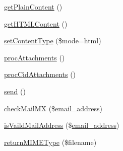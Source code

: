 \begin{DoxyCompactItemize}
\item 
\hyperlink{classMail_ac1a5a2b325a14e6331f13d2b2b18d9f8}{get\+Plain\+Content} ()
\item 
\hyperlink{classMail_a74db66148c78f2e732a3f2797b108eae}{get\+H\+T\+M\+L\+Content} ()
\item 
\hyperlink{classMail_a326329d653ba8e831c724471189e41e3}{set\+Content\+Type} (\$mode=\textquotesingle{}html\textquotesingle{})
\item 
\hyperlink{classMail_a136e94d3b4ae6cea8944cf05f58754ce}{proc\+Attachments} ()
\item 
\hyperlink{classMail_a185f66ac96139a53251ede273a120d13}{proc\+Cid\+Attachments} ()
\item 
\hyperlink{classMail_a6520941b529c223c1b59ec7544f7f7d6}{send} ()
\item 
\hyperlink{classMail_a0bdfc629861cf1048ac189d61fd57ef4}{check\+Mail\+MX} (\$\hyperlink{ko_8install_8php_a1dffea0d5ba8194f8ef01f414af0c831}{email\+\_\+address})
\item 
\hyperlink{classMail_a2d7fd899ae79dc18e7804a044127dbac}{is\+Vaild\+Mail\+Address} (\$\hyperlink{ko_8install_8php_a1dffea0d5ba8194f8ef01f414af0c831}{email\+\_\+address})
\item 
\hyperlink{classMail_afe036d54e43919318cb8e081533e7b90}{return\+M\+I\+M\+E\+Type} (\$filename)
\end{DoxyCompactItemize}

